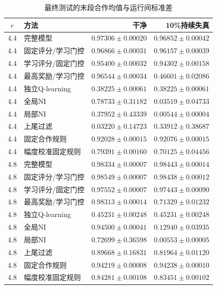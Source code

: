 \begin{table}[!htbp]
\centering\small
\caption{最终测试的末段合作均值与运行间标准差}
\label{tab:w2-final-tail}
\begin{tabular}{clrr}
\toprule
$r$ & 方法 & 干净 & 10\%持续失真 \\
\midrule
4.4 & 完整模型 & $0.97306\pm0.00020$ & $0.96852\pm0.00042$ \\
4.4 & 固定评分/学习门控 & $0.96866\pm0.00031$ & $0.96157\pm0.00039$ \\
4.4 & 学习评分/固定门控 & $0.95400\pm0.00032$ & $0.94302\pm0.00158$ \\
4.4 & 最高奖励/学习门控 & $0.96544\pm0.00034$ & $0.46601\pm0.02086$ \\
4.4 & 独立Q-learning & $0.38225\pm0.00061$ & $0.38225\pm0.00061$ \\
4.4 & 全局NI & $0.78733\pm0.31182$ & $0.03519\pm0.04733$ \\
4.4 & 局部NI & $0.37952\pm0.43339$ & $0.00544\pm0.00004$ \\
4.4 & 上尾过滤 & $0.03220\pm0.14723$ & $0.33912\pm0.38687$ \\
4.4 & 固定合作规则 & $0.92028\pm0.00015$ & $0.92076\pm0.00015$ \\
4.4 & 幅度校准固定规则 & $0.79391\pm0.00160$ & $0.70125\pm0.04456$ \\
\midrule
4.8 & 完整模型 & $0.98334\pm0.00007$ & $0.98443\pm0.00014$ \\
4.8 & 固定评分/学习门控 & $0.98549\pm0.00007$ & $0.98438\pm0.00012$ \\
4.8 & 学习评分/固定门控 & $0.97552\pm0.00007$ & $0.97443\pm0.00090$ \\
4.8 & 最高奖励/学习门控 & $0.98313\pm0.00014$ & $0.71329\pm0.01232$ \\
4.8 & 独立Q-learning & $0.45231\pm0.00248$ & $0.45231\pm0.00248$ \\
4.8 & 全局NI & $0.94500\pm0.00041$ & $0.12940\pm0.03935$ \\
4.8 & 局部NI & $0.72699\pm0.36598$ & $0.00553\pm0.00005$ \\
4.8 & 上尾过滤 & $0.89668\pm0.16831$ & $0.81964\pm0.01120$ \\
4.8 & 固定合作规则 & $0.94219\pm0.00008$ & $0.94238\pm0.00010$ \\
4.8 & 幅度校准固定规则 & $0.84281\pm0.00108$ & $0.83451\pm0.00102$ \\
\bottomrule
\end{tabular}
\par{}
\end{table}
